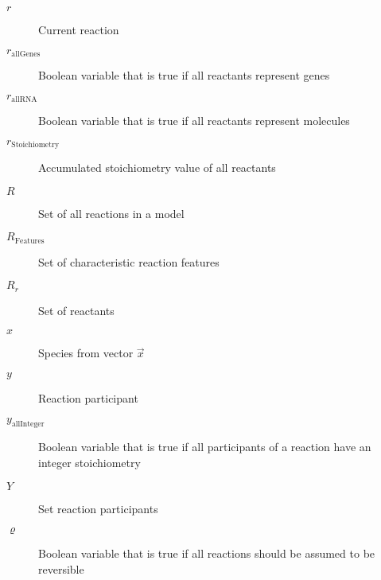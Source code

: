 \begin{description}
\item[$r$]                 Current reaction
\item[$r_\mathrm{allGenes}$]  Boolean variable that is true if all reactants represent genes
\item[$r_\mathrm{allRNA}$]          Boolean variable that is true if all reactants represent \RNA molecules
\item[$r_\mathrm{Stoichiometry}$]   Accumulated stoichiometry value of all reactants
\item[$R$]                 Set of all reactions in a model
\item[$R_\mathrm{Features}$] Set of characteristic reaction features
\item[$R_r$]               Set of reactants
\item[$x$]                 Species from vector $\vec{x}$
\item[$y$]                 Reaction participant
\item[$y_\mathrm{allInteger}$]      Boolean variable that is true if all participants of a reaction have an integer stoichiometry
\item[$Y$]                 Set reaction participants
\item[$\varrho$]           Boolean variable that is true if all reactions should be assumed to be reversible
\end{description}

